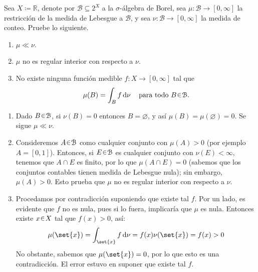 \setcounter{neje}{30}
\begin{nejer}
Sea $X \coloneq \mathbb{R}$, denote por $\mathcal{B} \subseteq 2^X$ a la $\sigma$-álgebra de Borel, sea $\mu \colon \mathcal{B} \to [0, \infty]$ la restricción de la medida de Lebesgue a $\mathcal{B}$, y sea $\nu \colon \mathcal{B} \to [0, \infty]$ la medida de conteo. Pruebe lo siguiente.
\begin{enumerate}[label = (\roman*), leftmargin=1.8em]
\item $\mu \ll \nu$.
\item $\mu$ no es regular interior con respecto a $\nu$.
\item No existe ninguna función medible $f \colon X \to [0, \infty]$ tal que
$$
\mu(B) = \int_B f \dd{\nu} \quad \text{para todo } B \en \mathcal{B}.
$$
\end{enumerate}
\end{nejer}
\begin{sol}
\begin{enumerate}[label = (\roman*), leftmargin=1.8em]
\item %
Dado $B\en\mathcal{B}$, si $\nu(B) = 0$ entonces $B=\varnothing$, y así $\mu(B) = \mu(\varnothing) = 0$. Se sigue $\mu \ll \nu$.
\item %
Consideremos $A \en\mathcal{B}$ como cualquier conjunto con $\mu(A) > 0$ (por ejemplo $A = [0,1]$). Entonces, si $E \en\mathcal{B}$ es cualquier conjunto con $\nu(E) < \infty$, tenemos que $A\cap E$ es finito, por lo que $\mu(A \cap E) = 0$ (sabemos que los conjuntos contables tienen medida de Lebesgue nula); sin embargo, $\mu(A)>0$. Esto prueba que $\mu$ no es regular interior con respecto a $\nu$.
\item %
Procedamos por contradicción suponiendo que existe tal $f$. Por un lado, es evidente que $f$ no es nula, pues si lo fuera, implicaría que $\mu$ es nula. Entonces existe $x\en X$ tal que $f(x) > 0$, así:
\[
\mu(\set{x})
= \int_{\set{x}} f \dd{\nu} = f(x)\nu(\set{x}) = f(x)>0
\]
No obstante, sabemos que $\mu(\set{x}) = 0$, por lo que esto es una contradicción. El error estuvo en suponer que existe tal $f$.
\end{enumerate}
\end{sol}